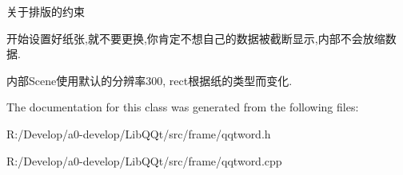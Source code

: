 关于排版的约束
\begin{DoxyEnumerate}
\item 开始设置好纸张,就不要更换,你肯定不想自己的数据被截断显示,内部不会放缩数据.
\item 内部\+Scene使用默认的分辨率300, rect根据纸的类型而变化. 
\end{DoxyEnumerate}

The documentation for this class was generated from the following files\+:\begin{DoxyCompactItemize}
\item 
R\+:/\+Develop/a0-\/develop/\+Lib\+Q\+Qt/src/frame/qqtword.\+h\item 
R\+:/\+Develop/a0-\/develop/\+Lib\+Q\+Qt/src/frame/qqtword.\+cpp\end{DoxyCompactItemize}
